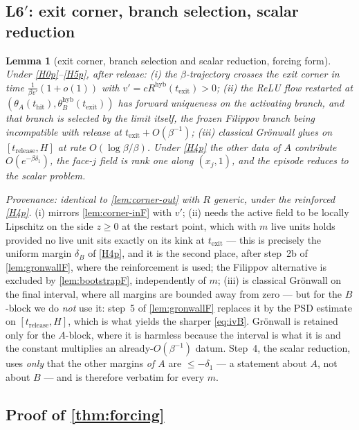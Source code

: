 \documentclass[11pt]{article}
\newtheorem{lemma}[lemma]{Lemma}
\theoremstyle{definition}
\theoremstyle{remark}
\newcommand{\thit}{t_{\mathrm{hit}}}
\newcommand{\texit}{t_{\mathrm{exit}}}
\newcommand{\trel}{t_{\mathrm{release}}}
\newcommand{\hyb}{\mathrm{hyb}}
\begin{document}
\subsection{L6$'$: exit corner, branch selection, scalar
reduction}\label{app:F6}

\begin{lemma}[exit corner, branch selection and scalar reduction, forcing
form]\label{lem:corner-outF}
Under \textup{\eqref{H0p}--\eqref{H5p}}, after release: (i) the $\beta$-trajectory
crosses the exit corner in time $\tfrac{1}{\beta v'}(1+o(1))$ with
$v'=cR^{\hyb}(\texit)>0$; (ii) the ReLU flow restarted at
$(\theta_A(\thit),\theta_B^{\hyb}(\texit))$ has forward uniqueness on the
activating branch, and that branch is selected by the limit itself, the frozen
Filippov branch being incompatible with release at $\texit+O(\beta^{-1})$;
(iii) classical Gr\"onwall glues on $[\trel,H]$ at rate $O(\log\beta/\beta)$.
Under \eqref{H4p} the other data of $A$ contribute $O(e^{-\beta\delta_1})$, the
face-$j$ field is rank one along $(x_j,1)$, and the episode reduces to the
scalar problem.
\end{lemma}

\noindent\emph{Provenance: identical to \cref{lem:corner-out} with $R$ generic,
under the reinforced \eqref{H4p}.} (i) mirrors \cref{lem:corner-inF} with $v'$;
(ii) needs the active field to be locally Lipschitz on the side $z\ge0$ at the
restart point, which with $m$ live units holds provided no live unit sits
exactly on its kink at $\texit$ --- this is precisely the uniform margin
$\delta_B$ of \eqref{H4p}, and it is the second place, after step~2b of
\cref{lem:gronwallF}, where the reinforcement is used; the Filippov alternative
is excluded by \cref{lem:bootstrapF}, independently of $m$; (iii) is classical
Gr\"onwall on the final interval, where all margins are bounded away from zero
--- but for the $B$-block we do \emph{not} use it: step~5 of
\cref{lem:gronwallF} replaces it by the PSD estimate on $[\trel,H]$, which is
what yields the sharper \eqref{eq:ivB}. Gr\"onwall is retained only for the
$A$-block, where it is harmless because the interval is what it is and the
constant multiplies an already-$O(\beta^{-1})$ datum. Step~4, the scalar
reduction, uses \emph{only} that the other margins \emph{of $A$} are
$\le-\delta_1$ --- a statement about $A$, not about $B$ --- and is therefore
verbatim for every $m$.

\subsection{Proof of \texorpdfstring{\cref{thm:forcing}}{the forcing
theorem}}\label{app:forcing-proof}
\end{document}
